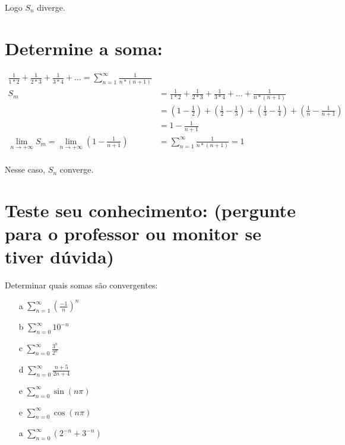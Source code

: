 \documentclass[12pt,openany]{book}
\begin{document}
Logo $S_n$ diverge.

\section{Determine a soma:}
\begin{align*}
\frac{1}{1*2} + \frac{1}{2*3} + \frac{1}{3*4} + \hdots = \sum_{n = 1}^{\infty} \frac{1}{n*(n+1)} \\
S_m &= \frac{1}{1*2} + \frac{1}{2*3} + \frac{1}{3*4} + \hdots + \frac{1}{n*(n+1)}\\
 &= \left(1 - \frac{1}{2}\right) + \left(\frac{1}{2} - \frac{1}{3}\right) + \left(\frac{1}{3} - \frac{1}{4}\right) + \left(\frac{1}{n} - \frac{1}{n+1}\right) \\
 &= 1 - \frac{1}{n+1} \\
 \lim_{n \rightarrow +\infty} S_m = \lim_{n \rightarrow +\infty} \left(1 - \frac{1}{n+1} \right) &=  \sum_{n = 1}^{\infty} \frac{1}{n*(n+1)} = 1 \\
\end{align*}

Nesse caso, $S_n$ converge.

\section{Teste seu conhecimento: (pergunte para o professor ou monitor se tiver dúvida)}
\label{sec:s39}

Determinar quais somas são convergentes:
\begin{itemize}
\item [a] $\displaystyle{\sum_{n = 1}^{\infty} \left(\frac{-1}{n}\right)^n}$
\item [b] $\displaystyle{\sum_{n = 0}^{\infty} 10^{-n} }$
\item [c] $\displaystyle{\sum_{n = 0}^{\infty} \frac{3^n}{2^n}}$
\item [d] $\displaystyle{\sum_{n = 0}^{\infty} \frac{n+5}{2n+4}}$
\item [e] $\displaystyle{\sum_{n = 0}^{\infty} \sin (n\pi)}$
\item [e] $\displaystyle{\sum_{n = 0}^{\infty} \cos (n\pi)}$
\item [a] $\displaystyle{\sum_{n = 0}^{\infty}  (2^{-n} + 3^{-n})}$
\end{itemize}
\end{document}
